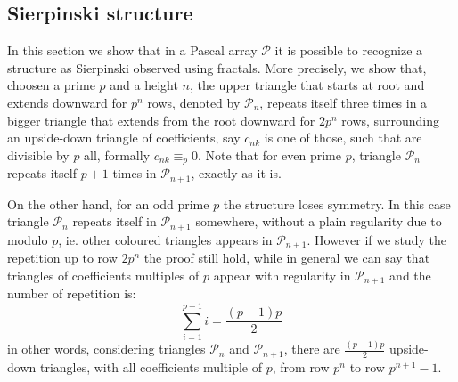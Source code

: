 \documentclass[10pt,a4paper]{article} %
\begin{document}
    \subsection{Sierpinski structure}

    In this section we show that in a Pascal array $\mathcal{P}$ it is
    possible to recognize a structure as Sierpinski observed using
    fractals. More precisely, we show that, choosen a prime $p$ and a
    height $n$, the upper triangle that starts at root and extends
    downward for $p^n$ rows, denoted by $\mathcal{P}_n$, repeats
    itself three times in a bigger triangle that extends from the root
    downward for $2p^{n}$ rows, surrounding an upside-down triangle of
    coefficients, say $c_{nk}$ is one of those, such that are divisible
    by $p$ all, formally $c_{nk} \equiv_p 0$. Note that for even prime
    $p$, triangle $\mathcal{P}_n$ repeats itself $p+1$ times in
    $\mathcal{P}_{n+1}$, exactly as it is.
    
    On the other hand, for an odd prime $p$ the structure loses
    symmetry. In this case triangle $\mathcal{P}_n$ repeats itself in
    $\mathcal{P}_{n+1}$ somewhere, without a plain regularity due to
    modulo $p$, ie. other coloured triangles appears in
    $\mathcal{P}_{n+1}$.  However if we study the repetition up to row
    $2p^n$ the proof still hold, while in general we can say that
    triangles of coefficients multiples of $p$ appear with regularity
    in $\mathcal{P}_{n+1}$ and the number of repetition is:
    \begin{displaymath}
        \sum_{i=1}^{p-1}{i} = \frac{(p-1)p}{2}
    \end{displaymath}
    in other words, considering triangles $\mathcal{P}_{n}$ and
    $\mathcal{P}_{n+1}$, there are $\frac{(p-1)p}{2}$ upside-down
    triangles, with all coefficients multiple of $p$, from row $p^n$
    to row $p^{n+1}-1$.
\end{document}
